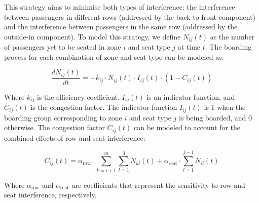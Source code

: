 \documentclass[12pt]{article}
\begin{document}
This strategy aims to minimise both types of interference: the interference between passengers in different rows (addressed by the back-to-front component) and the interference between passengers in the same row (addressed by the outside-in component). To model this strategy, we define $N_{ij}(t)$ as the number of passengers yet to be seated in zone $i$ and seat type $j$ at time $t$. The boarding process for each combination of zone and seat type can be modeled as:

\begin{equation}
\frac{dN_{ij}(t)}{dt} = -k_{ij} \cdot N_{ij}(t) \cdot I_{ij}(t) \cdot (1 - C_{ij}(t))
\end{equation}

Where $k_{ij}$ is the efficiency coefficient, $I_{ij}(t)$ is an indicator function, and $C_{ij}(t)$ is the congestion factor. The indicator function $I_{ij}(t)$ is 1 when the boarding group corresponding to zone $i$ and seat type $j$ is being boarded, and 0 otherwise. The congestion factor $C_{ij}(t)$ can be modeled to account for the combined effects of row and seat interference:

\begin{equation}
C_{ij}(t) = \alpha_{\text{row}} \cdot \sum_{k=i+1}^{m} \sum_{l=1}^{3} N_{kl}(t) + \alpha_{\text{seat}} \cdot \sum_{l=1}^{j-1} N_{il}(t)
\end{equation}

Where $\alpha_{\text{row}}$ and $\alpha_{\text{seat}}$ are coefficients that represent the sensitivity to row and seat interference, respectively.
\end{document}
